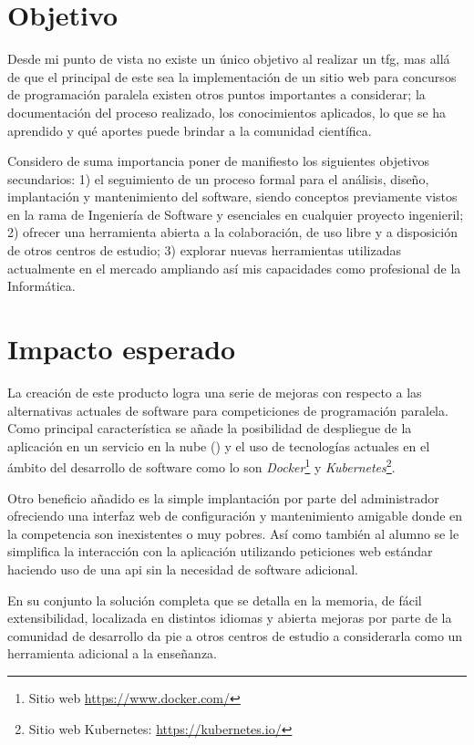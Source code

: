 \documentclass[11pt,spanish,listoffigures,listoftables]{tfgetsinf}
\begin{document}
\section{Objetivo}

Desde mi punto de vista no existe un único objetivo al realizar un \acrshort{tfg}, mas allá de que el principal de este sea la implementación de un sitio web para concursos de programación paralela existen otros puntos importantes a considerar; la documentación del proceso realizado, los conocimientos aplicados, lo que se ha aprendido y qué aportes puede brindar a la comunidad científica. \par 

Considero de suma importancia poner de manifiesto los siguientes objetivos secundarios: 1) el seguimiento de un proceso formal para el análisis, diseño, implantación y mantenimiento del software, siendo conceptos previamente vistos en la rama de Ingeniería de Software y esenciales en cualquier proyecto ingenieril; 2) ofrecer una herramienta  abierta a la colaboración, de uso libre y a disposición de otros centros de estudio; 3) explorar nuevas herramientas utilizadas actualmente en el mercado ampliando así mis capacidades como profesional de la Informática.

\section{Impacto esperado}

La creación de este producto logra una serie de mejoras con respecto a las alternativas actuales de software para competiciones de programación paralela. Como principal característica se añade la posibilidad de despliegue de la aplicación en un servicio en la nube () y el uso de tecnologías actuales en el ámbito del desarrollo de software como lo son \textit{Docker}\footnote{Sitio web \url{https://www.docker.com/}} y \textit{Kubernetes}\footnote{Sitio web Kubernetes: \url{https://kubernetes.io/}}.

Otro beneficio añadido es la simple implantación por parte del \gls{administrador} ofreciendo una interfaz web de configuración y mantenimiento amigable donde en la competencia son inexistentes o muy pobres. Así como también al \gls{alumno} se le simplifica la interacción con la aplicación utilizando peticiones web estándar haciendo uso de una \acrshort{api} sin la necesidad de software adicional.

En su conjunto la solución completa que se detalla en la memoria, de fácil extensibilidad, localizada en distintos idiomas y abierta mejoras por parte de la comunidad de desarrollo da pie a otros centros de estudio a considerarla como un herramienta adicional a la enseñanza.
\end{document}
